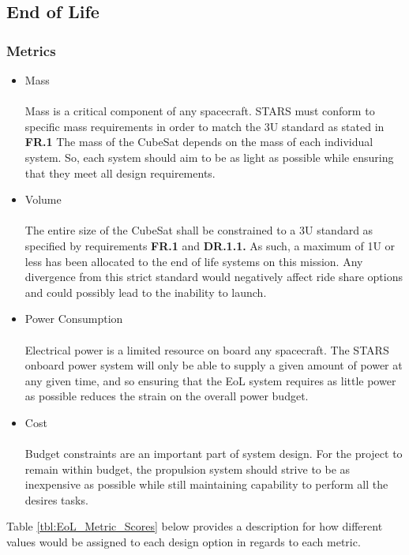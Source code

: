 
\subsection{End of Life}
\subsubsection{Metrics}
\begin{itemize}
\item Mass\\
\\
Mass is a critical component of any spacecraft. STARS must conform to specific mass requirements in order to match the 3U standard as stated in \textbf{FR.1} The mass of the CubeSat depends on the mass of each individual system. So, each system should aim to be as light as possible while ensuring that they meet all design requirements.
\\
\item{Volume} \\
\\
The entire size of the CubeSat shall be constrained to a 3U standard as specified by requirements \textbf{FR.1}  and  \textbf{DR.1.1.}  As  such,  a maximum  of  1U  or  less  has  been  allocated  to  the  end  of  life  systems on  this mission. Any  divergence  from  this  strict  standard  would  negatively  affect  ride  share options  and  could possibly lead to the inability to launch.
\\
\item{Power Consumption} \\
\\
Electrical power is a limited resource on board any spacecraft. The STARS onboard power system will only be able to supply a given amount of power at any given time, and so ensuring that the EoL system requires as little power as possible reduces the strain on the overall power budget.
\\
\item{Cost} \\
\\
Budget constraints are an important part of system design. For the project to remain within budget, the propulsion system should strive to be as inexpensive as possible while still maintaining capability to perform all the desires tasks.  
\end{itemize}

Table \ref{tbl:EoL_Metric_Scores} below provides a description for how different values would be assigned to each design option in regards to each metric. 

